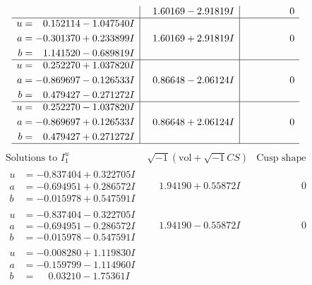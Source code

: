 \documentclass[1p]{elsarticle_modified}
\theoremstyle{definition}
\newcommand{\I}{\sqrt{-1}}
\begin{document}
$$\begin{array}{c|c|c}
 & \phantom{-}1.60169 - 2.91819 I & \phantom{-0.000000 } 0 \\ \hline\begin{aligned}
u &= \phantom{-}0.152114 - 1.047540 I \\
a &= -0.301370 + 0.233899 I \\
b &= \phantom{-}1.141520 - 0.689819 I\end{aligned}
 & \phantom{-}1.60169 + 2.91819 I & \phantom{-0.000000 } 0 \\ \hline\begin{aligned}
u &= \phantom{-}0.252270 + 1.037820 I \\
a &= -0.869697 - 0.126533 I \\
b &= \phantom{-}0.479427 - 0.271272 I\end{aligned}
 & \phantom{-}0.86648 - 2.06124 I & \phantom{-0.000000 } 0 \\ \hline\begin{aligned}
u &= \phantom{-}0.252270 - 1.037820 I \\
a &= -0.869697 + 0.126533 I \\
b &= \phantom{-}0.479427 + 0.271272 I\end{aligned}
 & \phantom{-}0.86648 + 2.06124 I & \phantom{-0.000000 } 0\\
 \hline 
 \end{array}$$\newpage$$\begin{array}{c|c|c}  
\text{Solutions to }I^u_{1}& \I (\text{vol} + \sqrt{-1}CS) & \text{Cusp shape}\\
 \hline 
\begin{aligned}
u &= -0.837404 + 0.322705 I \\
a &= -0.694951 + 0.286572 I \\
b &= -0.015978 + 0.547591 I\end{aligned}
 & \phantom{-}1.94190 + 0.55872 I & \phantom{-0.000000 } 0 \\ \hline\begin{aligned}
u &= -0.837404 - 0.322705 I \\
a &= -0.694951 - 0.286572 I \\
b &= -0.015978 - 0.547591 I\end{aligned}
 & \phantom{-}1.94190 - 0.55872 I & \phantom{-0.000000 } 0 \\ \hline\begin{aligned}
u &= -0.008280 + 1.119830 I \\
a &= -0.159799 - 1.114960 I \\
b &= \phantom{-}0.03210 - 1.75361 I\end{aligned}

\end{array}$$
\end{document}
